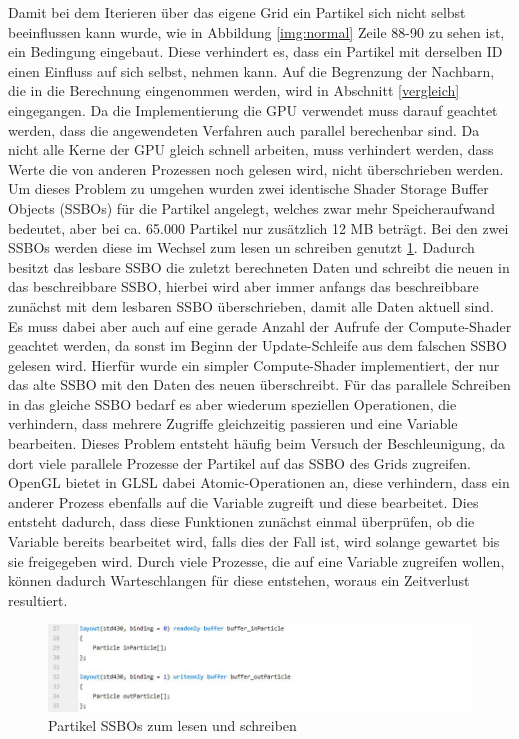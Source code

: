 \documentclass[intern,palatino]{cgBA}
\begin{document}
Damit bei dem Iterieren über das eigene Grid ein Partikel sich nicht selbst beeinflussen kann wurde, wie in Abbildung \ref{img:normal} Zeile 88-90 zu sehen ist, ein Bedingung eingebaut. Diese verhindert es, dass ein Partikel mit derselben ID einen Einfluss auf sich selbst, nehmen kann. Auf die Begrenzung der Nachbarn, die in die Berechnung eingenommen werden, wird in Abschnitt \ref{vergleich} eingegangen.
\newline
Da die Implementierung die GPU verwendet muss darauf geachtet werden, dass die angewendeten Verfahren auch parallel berechenbar sind. Da nicht alle Kerne der GPU gleich schnell arbeiten, muss verhindert werden, dass Werte die von anderen Prozessen noch gelesen wird, nicht überschrieben werden.
Um dieses Problem zu umgehen wurden zwei identische Shader Storage Buffer Objects (SSBOs) für die Partikel angelegt, welches zwar mehr Speicheraufwand bedeutet, aber bei ca. 65.000 Partikel nur zusätzlich 12 MB beträgt. Bei den zwei SSBOs werden diese im Wechsel zum lesen un schreiben genutzt \ref{img:flipflop}. Dadurch besitzt das lesbare SSBO die zuletzt berechneten Daten und schreibt die neuen in das beschreibbare SSBO, hierbei wird aber immer anfangs das beschreibbare zunächst mit dem lesbaren SSBO überschrieben, damit alle Daten aktuell sind.
Es muss dabei aber auch auf eine gerade Anzahl der Aufrufe der Compute-Shader geachtet werden, da sonst im Beginn der Update-Schleife aus dem falschen SSBO gelesen wird. Hierfür wurde ein simpler Compute-Shader implementiert, der nur das alte SSBO mit den Daten des neuen überschreibt.
\newline
Für das parallele Schreiben in das gleiche SSBO bedarf es aber wiederum speziellen Operationen, die verhindern, dass mehrere Zugriffe gleichzeitig passieren und eine Variable bearbeiten. Dieses Problem entsteht häufig beim Versuch der Beschleunigung, da dort viele parallele Prozesse der Partikel auf das SSBO des Grids zugreifen.
\newline
OpenGL bietet in GLSL dabei Atomic-Operationen an, diese verhindern, dass ein anderer Prozess ebenfalls auf die Variable zugreift und diese bearbeitet. Dies entsteht dadurch, dass diese Funktionen zunächst einmal überprüfen, ob die Variable bereits bearbeitet wird, falls dies der Fall ist, wird solange gewartet bis sie freigegeben wird. Durch viele Prozesse, die auf eine Variable zugreifen wollen, können dadurch Warteschlangen für diese entstehen, woraus ein Zeitverlust resultiert.

\begin{figure}[H]
	\centering
	\includegraphics[width=1.3\columnwidth]{Bilder/Flipflop.jpg}
	\caption{Partikel SSBOs zum lesen und schreiben}
	\label{img:flipflop}
\end{figure}
\end{document}

